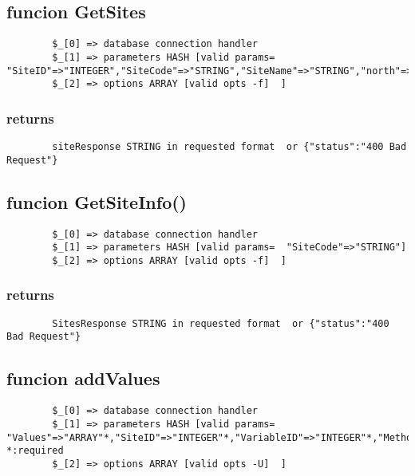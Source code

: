 \documentclass{article}
\begin{document}
\subsection*{funcion GetSites\label{funcion_GetSites}}
\begin{verbatim}
        $_[0] => database connection handler
        $_[1] => parameters HASH [valid params=  "SiteID"=>"INTEGER","SiteCode"=>"STRING","SiteName"=>"STRING","north"=>"FLOAT","south"=>"FLOAT","east"=>"FLOAT","west"=>"FLOAT","SiteType"=>"STRING","State"=>"STRING","County"=>"STRING"]
        $_[2] => options ARRAY [valid opts -f]  ]
\end{verbatim}
\subsubsection*{returns\label{returns}}
\begin{verbatim}
        siteResponse STRING in requested format  or {"status":"400 Bad Request"}
\end{verbatim}
\subsection*{funcion GetSiteInfo()\label{funcion_GetSiteInfo_}}
\begin{verbatim}
        $_[0] => database connection handler
        $_[1] => parameters HASH [valid params=  "SiteCode"=>"STRING"]
        $_[2] => options ARRAY [valid opts -f]  ]
\end{verbatim}
\subsubsection*{returns\label{returns}}
\begin{verbatim}
        SitesResponse STRING in requested format  or {"status":"400 Bad Request"}
\end{verbatim}
\subsection*{funcion addValues\label{funcion_addValues}}
\begin{verbatim}
        $_[0] => database connection handler
        $_[1] => parameters HASH [valid params=  "Values"=>"ARRAY"*,"SiteID"=>"INTEGER"*,"VariableID"=>"INTEGER"*,"MethodID"=>"INTEGER","SourceID"=>"INTEGER"*,"QualityControl"=>"INTEGER","UTCOffset"=>"INTEGER"]    *:required
        $_[2] => options ARRAY [valid opts -U]  ]
\end{verbatim}
\end{document}
